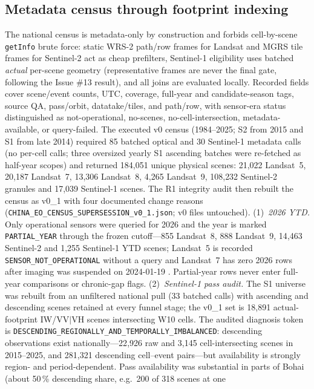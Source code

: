 \subsection{Metadata census through footprint indexing}
The national census is metadata-only by construction and forbids
cell-by-scene \texttt{getInfo} brute force: static WRS-2 path/row
frames for Landsat and MGRS tile frames for Sentinel-2 act as cheap
prefilters, Sentinel-1 eligibility uses batched \emph{actual}
per-scene geometry (representative frames are never the final gate,
following the Issue \#13 result), and all joins are evaluated locally.
Recorded fields cover scene/event counts, UTC, coverage, full-year and
candidate-season tags, source QA, pass/orbit, datatake/tiles, and
path/row, with sensor-era status distinguished as not-operational,
no-scenes, no-cell-intersection, metadata-available, or query-failed.
The executed v0 census (1984--2025; S2 from 2015 and S1 from late
2014) required 85 batched optical and 30 Sentinel-1 metadata calls (no
per-cell calls; three oversized yearly S1 ascending batches were
re-fetched as half-year scopes) and returned 184{,}051 unique physical
scenes: 21{,}022 Landsat~5, 20{,}187 Landsat~7, 13{,}306 Landsat~8,
4{,}265 Landsat~9, 108{,}232 Sentinel-2 granules and 17{,}039
Sentinel-1 scenes. The R1 integrity audit then rebuilt the census as
v0\_1 with four documented change reasons
(\texttt{CHINA\_EO\_CENSUS\_SUPERSESSION\_v0\_1.json}; v0 files
untouched). (1)~\emph{2026 YTD.} Only operational sensors were queried
for 2026 and the year is marked \texttt{PARTIAL\_YEAR} through the
frozen cutoff---855 Landsat~8, 888 Landsat~9, 14{,}463 Sentinel-2 and
1{,}255 Sentinel-1 YTD scenes; Landsat~5 is recorded
\texttt{SENSOR\_NOT\_OPERATIONAL} without a query and Landsat~7 has zero
2026 rows after imaging was suspended on 2024-01-19
\citep{usgs2024l7extended}. Partial-year rows never enter full-year
comparisons or chronic-gap flags. (2)~\emph{Sentinel-1 pass audit.}
The S1 universe was rebuilt from an unfiltered national pull (33
batched calls) with ascending and descending scenes retained at every
funnel stage; the v0\_1 set is 18{,}891 actual-footprint IW/VV$|$VH
scenes intersecting W10 cells. The audited diagnosis token is
\texttt{DESCENDING\_REGIONALLY\_AND\_TEMPORALLY\_IMBALANCED}:
descending observations exist nationally---22{,}926 raw and 3{,}145
cell-intersecting scenes in 2015--2025, and 281{,}321 descending
cell--event pairs---but availability is strongly region- and
period-dependent. Pass availability was substantial in parts of
Bohai (about 50\,\% descending share, e.g.\ 200 of 318 scenes at one
